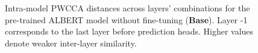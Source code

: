 \documentclass[a4paper, nobind]{templates/ociamthesis}
\begin{document}
\begin{figure}

{\centering {}\newline{}

}

\caption{Intra-model PWCCA distances across layers' combinations for the pre-trained ALBERT model without fine-tuning (\textbf{Base}). Layer -1 corresponds to the last layer before prediction heads. Higher values denote weaker inter-layer similarity.}\label{fig:pwcca-intra-base}
\end{figure}
\end{document}
